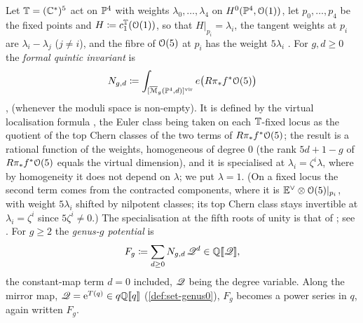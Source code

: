 \begin{defn}
\label{def:set-fq}
Let $\mathbb{T}=(\mathbb{C}^*)^5$ act on $\mathbb{P}^4$ with weights $\lambda_0,\dots,\lambda_4$ on $H^0(\mathbb{P}^4,\mathcal{O}(1))$, let $p_0,\dots,p_4$ be the fixed points and $H\coloneqq c_1^{\mathbb{T}}(\mathcal{O}(1))$, so that $H|_{p_i}=\lambda_i$, the tangent weights at $p_i$ are $\lambda_i-\lambda_j$ ($j\neq i$), and the fibre of $\mathcal{O}(5)$ at $p_i$ has the weight $5\lambda_i$ \cite[(10)]{LP20}. For $g,d\geq0$ the \emph{formal quintic invariant} is
\[
N_{g,d}\coloneqq\int_{[\overline{\mathcal M}_g(\mathbb{P}^4,d)]^{\mathrm{vir}}}e\bigl(R\pi_*f^*\mathcal{O}(5)\bigr)
\]
\cite[Section~0.2, (5)]{LP18}, \cite[Section~0.2, (5)]{LP20} (whenever the moduli space is non-empty). It is defined by the virtual localisation formula \cite{MR1666787}, the Euler class being taken on each $\mathbb{T}$-fixed locus as the quotient of the top Chern classes of the two terms of $R\pi_*f^*\mathcal{O}(5)$; the result is a rational function of the weights, homogeneous of degree $0$ (the rank $5d+1-g$ of $R\pi_*f^*\mathcal{O}(5)$ equals the virtual dimension), and it is specialised at $\lambda_i=\zeta^i\lambda$, where by homogeneity it does not depend on $\lambda$; we put $\lambda=1$. (On a fixed locus the second term comes from the contracted components, where it is $\mathbb{E}^\vee\otimes\mathcal{O}(5)|_{p_i}$, with weight $5\lambda_i$ shifted by nilpotent classes; its top Chern class stays invertible at $\lambda_i=\zeta^i$ since $5\zeta^i\neq0$.) The specialisation at the fifth roots of unity is that of \cite{ZZ08}; see \cite[Section~3.1, (9)]{GJR18}. For $g\geq2$ the \emph{genus-$g$ potential} is
\[
F_g\coloneqq\sum_{d\geq0}N_{g,d}\,\mathscr{Q}^d\in\mathbb{Q}[\![ \mathscr{Q} ]\!],
\]
the constant-map term $d=0$ included, $\mathscr{Q}$ being the degree variable. Along the mirror map, $\mathscr{Q}=\mathrm{e}^{T(q)}\in q\mathbb{Q}[\![ q ]\!]$ (\cref{def:set-genus0}), $F_g$ becomes a power series in $q$, again written $F_g$.


\end{defn}
